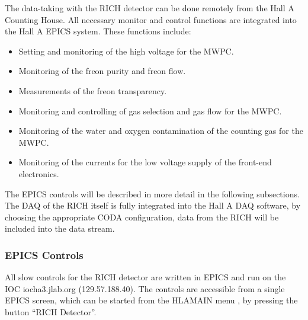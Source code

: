{The data-taking with the RICH detector can be done remotely from the Hall A Counting House.
All necessary monitor and control functions are integrated into the Hall A EPICS system.
These functions include:
\begin{itemize}
\item Setting and monitoring of the high voltage for the MWPC.
\item Monitoring of the freon purity and freon flow.
\item Measurements of the freon transparency.
\item Monitoring and controlling of gas selection and gas flow for the MWPC.
\item Monitoring of the water and oxygen contamination of the counting gas for the MWPC.
\item Monitoring of the currents for the low voltage supply of the front-end electronics. 
\end{itemize}
The EPICS controls will be described in more detail in the following subsections.
The DAQ of the RICH itself is fully integrated into the Hall A DAQ software, by
choosing the appropriate CODA configuration, data from the RICH will be included into the
data stream. 

\subsubsection{EPICS Controls}

All slow controls for the RICH detector are written in EPICS
and run on the IOC iocha3.jlab.org (129.57.188.40). 
The controls are accessible from a single EPICS screen,
which can be started from the HLAMAIN menu \cite{EPICSwww}, by pressing the 
button ``RICH Detector''.


}
